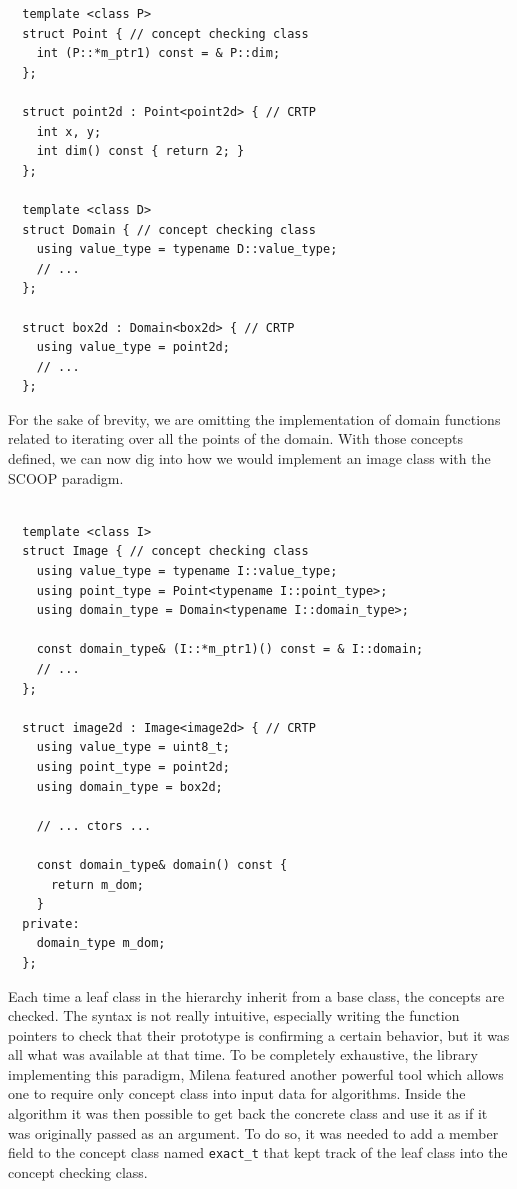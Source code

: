 \begin{verbatim}
  template <class P>
  struct Point { // concept checking class
    int (P::*m_ptr1) const = & P::dim;
  };

  struct point2d : Point<point2d> { // CRTP
    int x, y;
    int dim() const { return 2; }
  };

  template <class D>
  struct Domain { // concept checking class
    using value_type = typename D::value_type;
    // ...
  };

  struct box2d : Domain<box2d> { // CRTP
    using value_type = point2d;
    // ...
  };
\end{verbatim}

For the sake of brevity, we are omitting the implementation of domain functions related to iterating over all the points
of the domain. With those concepts defined, we can now dig into how we would implement an image class with the SCOOP
paradigm.

\begin{verbatim}

  template <class I>
  struct Image { // concept checking class
    using value_type = typename I::value_type;
    using point_type = Point<typename I::point_type>;
    using domain_type = Domain<typename I::domain_type>;

    const domain_type& (I::*m_ptr1)() const = & I::domain;
    // ...
  };

  struct image2d : Image<image2d> { // CRTP
    using value_type = uint8_t;
    using point_type = point2d;
    using domain_type = box2d;

    // ... ctors ...

    const domain_type& domain() const {
      return m_dom;
    }
  private:
    domain_type m_dom;
  };
\end{verbatim}

Each time a leaf class in the hierarchy inherit from a base class, the concepts are checked. The syntax is not really
intuitive, especially writing the function pointers to check that their prototype is confirming a certain behavior, but
it was all what was available at that time. To be completely exhaustive, the library implementing this paradigm, Milena
featured another powerful tool which allows one to require only concept class into input data for algorithms. Inside the
algorithm it was then possible to get back the concrete class and use it as if it was originally passed as an argument.
To do so, it was needed to add a member field to the concept class named \texttt{exact\_t} that kept track of the leaf
class into the concept checking class.

